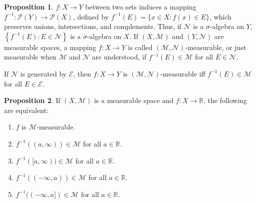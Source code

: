 \documentclass[12pt,a4paper]{book}
\newenvironment{enu}{\begin{enumerate}[(1)]}{\end{enumerate}}
\theoremstyle{definition}
\newtheorem{defn}{Definition}[section]
\newtheorem{prop}[defn]{Proposition}
\begin{document}
\begin{prop}
    $f: X \rightarrow Y$ between two sets induces a mapping $f^{-1}: \mathcal{P}(Y) \rightarrow \mathcal{P}(X)$, defined by $f^{-1}(E)=\{x \in X: f(x) \in E\}$, which preserves unions, intersections, and complements. Thus, if $\mathcal{N}$ is a $\sigma$-algebra on $Y$, $\left\{f^{-1}(E): E \in \mathcal{N}\right\}$ is a $\sigma$-algebra on $X$. If $(X, \mathcal{M})$ and $(Y, \mathcal{N})$ are measurable spaces, a mapping $f: X \rightarrow Y$ is called $(\mathcal{M}, \mathcal{N})$-measurable, or just measurable when $\mathcal{M}$ and $\mathcal{N}$ are understood, if $f^{-1}(E) \in \mathcal{M}$ for all $E \in \mathcal{N}$.

    If $\mathcal{N}$ is generated by $\mathcal{E}$, then $f: X \rightarrow Y$ is $(\mathcal{M}, \mathcal{N})$-measurable iff $f^{-1}(E) \in \mathcal{M}$ for all $E \in \mathcal{E}$.
\end{prop}
\begin{prop}
    If $(X, \mathcal{M})$ is a measurable space and $f: X \rightarrow \mathbb{R}$, the following are equivalent:
    \begin{enu}
        \item $f$ is $\mathcal{M}$-measurable.
        \item $f^{-1}((a, \infty)) \in \mathcal{M}$ for all $a \in \mathbb{R}$.
        \item $f^{-1}([a, \infty)) \in \mathcal{M}$ for all $a \in \mathbb{R}$.
                        \item $f^{-1}((-\infty, a)) \in \mathcal{M}$ for all $a \in \mathbb{R}$.
                        \item $f^{-1}((-\infty, a]) \in \mathcal{M}$ for all $a \in \mathbb{R}$.
    \end{enu}
\end{prop}
\end{document}
